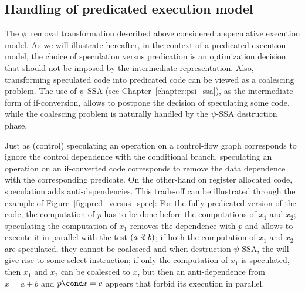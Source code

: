 \subsection{Handling of predicated execution model}

The $\phi$~removal transformation described above considered a speculative execution model. As we will illustrate hereafter, in the context of a predicated execution model, the choice of speculation versus predication is an optimization decision that should not be imposed by the intermediate representation. Also, transforming speculated code into predicated code can be viewed as a coalescing problem. The use of $\psi$-SSA (see Chapter~\ref{chapter:psi_ssa}), as the intermediate form of if-conversion, allows to postpone the decision of speculating some code, while the coalescing problem is naturally handled by the $\psi$-SSA destruction phase. 

Just as (control) speculating an operation on a control-flow graph corresponds to ignore the control dependence with the conditional branch, speculating an operation on an if-converted code corresponds to remove the data dependence with the corresponding predicate. On the other-hand on register allocated code, speculation adds anti-dependencies. This trade-off can be illustrated through the example of Figure~\ref{fig:pred_versus_spec}: For the fully predicated version of the code, the computation of $p$ has to be done before the computations of $x_1$ and $x_2$; speculating the computation of $x_1$ removes the dependence with $p$ and allows to execute it in parallel with the test $(a<\hspace{-.6em}?\ b)$; if both the computation of $x_1$ and $x_2$ are speculated, they cannot be coalesced and when destruction $\psi$-SSA, the \psifun\index{\psifun} will give rise to some select instruction; if only the computation of $x_1$ is speculated, then $x_1$ and $x_2$ can be coalesced to $x$, but then an anti-dependence from $x=a+b$ and $p\cond x = c $ appears that forbid its  execution in parallel.

